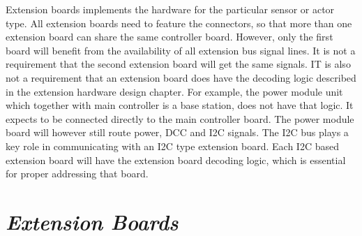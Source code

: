 Extension boards implements the hardware for the particular sensor or actor type. All extension boards need to feature the connectors, so that more than one extension board can share the same controller board. However, only the first board will benefit from the availability of all extension bus signal lines. It is not a requirement that the second extension board will get the same signals. IT is also not a requirement that an extension board does have the decoding logic described in the extension hardware design chapter. For example, the power module unit which together with main controller is a base station, does not have that logic. It expects to be connected directly to the main controller board. The power module board will however still route power, DCC and I2C signals. The I2C bus plays a key role in communicating with an I2C type extension board. Each I2C based extension board will have the extension board decoding logic, which is essential for proper addressing that board.


\section{\textit{Extension Boards}}

